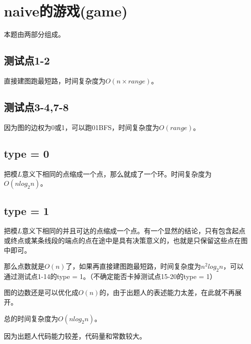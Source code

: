 \documentclass{ctexart}
\begin{document}
\newpage

\section{naive的游戏(game)}

本题由两部分组成。 \par

\subsection{测试点1-2}

直接建图跑最短路，时间复杂度为$O(n \times range)$。 \par

\subsection{测试点3-4,7-8}

因为图的边权为0或1，可以跑01BFS，时间复杂度为$O(range)$。 \par

\subsection{type = 0}

把模$L$意义下相同的点缩成一个点，那么就成了一个环。时间复杂度为$O(n log_2{n})$。 \par

\subsection{type = 1}

把模$L$意义下相同的并且可达的点缩成一个点。有一个显然的结论，只有包含起点或终点或某条线段的端点的点在途中是具有决策意义的，也就是只保留这些点在图中即可。 \par
那么点数就是$O(n)$了，如果再直接建图跑最短路，时间复杂度为$n ^ 2 log_2{n}$，可以通过测试点1-14的type = 1。（不确定能否卡掉测试点15-20的type = 1） \par
图的边数还是可以优化成$O(n)$的，由于出题人的表述能力太差，在此就不再展开。 \par
总的时间复杂度为$O(n log_2{n})$。 \par
因为出题人代码能力较差，代码量和常数较大。 \par
\end{document}
